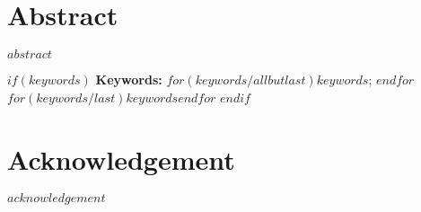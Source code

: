 
\pagestyle{empty}	   %
\cleardoublepage

\cleardoublepage

\pagestyle{plain}				%
\declaration
\cleardoublepage

\chapter*{Abstract}
\label{sec:abstract}
\vspace*{-10mm}

$abstract$

$if(keywords)$
\textbf{Keywords: } $for(keywords/allbutlast)$$keywords$; $endfor$$for(keywords/last)$$keywords$$endfor$
$endif$
\cleardoublepage

\chapter*{Acknowledgement}
\label{sec:acknowledgement}
\vspace*{-10mm}

$acknowledgement$
\cleardoublepage

\setcounter{tocdepth}{2}		%
\tableofcontents				%
\cleardoublepage

\listoffigures
\cleardoublepage

\listoftables
\cleardoublepage

\setcounter{page}{1}			%
\pagestyle{maincontentstyle} 	%
